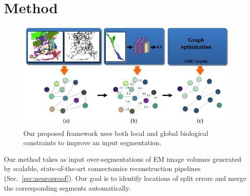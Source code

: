 \section{Method}

\begin{figure}[t!]
	\centering
	\includegraphics[width=\linewidth]{./figures/teaser_v2.png}
	\caption{Our proposed framework uses both local and global biological constraints to improve an input segmentation.}
	\label{fig:teaser}
\end{figure}

Our method takes as input over-segmentations of EM image volumes generated by scalable, state-of-the-art connectomics reconstruction pipelines (Sec.~\ref{sec:neuroproof}). 
Our goal is to identify locations of split errors and merge the corresponding segments automatically.

